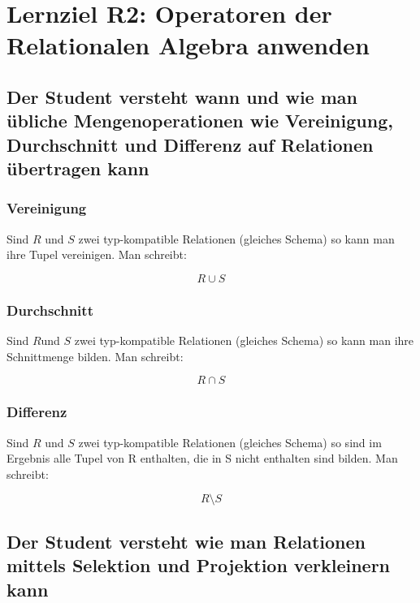 \section{Lernziel R2: Operatoren der Relationalen Algebra anwenden}

\subsection{Der Student versteht wann und wie man übliche Mengenoperationen wie Vereinigung, Durchschnitt und Differenz auf Relationen übertragen kann}

\subsubsection{Vereinigung}

Sind $R$ und $S$ zwei typ-kompatible Relationen (gleiches Schema) so kann man ihre Tupel vereinigen. Man schreibt:

\begin{equation}
R \cup S
\end{equation}

\subsubsection{Durchschnitt}

Sind $R$und $S$ zwei typ-kompatible Relationen (gleiches Schema) so kann man ihre Schnittmenge bilden. Man schreibt:

\begin{equation}
R \cap S
\end{equation}

\subsubsection{Differenz}

Sind $R$ und $S$ zwei typ-kompatible Relationen (gleiches Schema) so sind im Ergebnis alle Tupel von R enthalten, die in S nicht enthalten sind bilden. Man schreibt:

\begin{equation}
R \setminus S
\end{equation}

\subsection{Der Student versteht wie man Relationen mittels Selektion und Projektion verkleinern kann}

